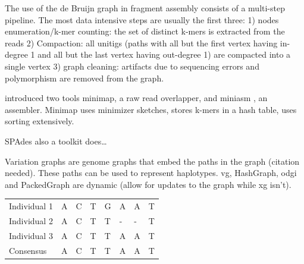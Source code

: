 \documentclass[11pt]{article}
\begin{document}

The use of the de Bruijn graph in fragment assembly consists of a multi-step 
pipeline.
The most data intensive steps are usually the first three: 1) nodes
enumeration/k-mer counting: the set of distinct k-mers is extracted from the 
reads 2) Compaction: all unitigs (paths with all but the first vertex having 
in-degree 1 and all but the last vertex having out-degree 1) are compacted into
a single vertex 3) graph cleaning: artifacts due to sequencing errors and
polymorphism are removed from the graph.

\cite{liMinimapMiniasmFast2016} introduced two tools minimap, a raw read 
overlapper, and miniasm \cite{liMinimapMiniasmFast2016}, an assembler. 
Minimap uses minimizer sketches, stores k-mers in a hash table, uses sorting 
extensively.

SPAdes also a toolkit does…

\newpage
Variation graphs are genome graphs that embed the paths in the graph 
(citation needed).
These paths can be used to represent haplotypes. vg, HashGraph, odgi and
PackedGraph are dynamic (allow for updates to the graph while xg isn’t).


\begin{center}
\begin{tabular}{llllllll}
\color{mypink}Individual 1 & \color{mypink} A & \color{mypink} C & \color{mypink} T & \color{mypink} G & \color{mypink} A & \color{mypink} A & \color{mypink} T\\
\color{myblue}Individual 2 & \color{myblue} A & \color{myblue} C & \color{myblue} T & \color{myblue} T & \color{myblue} - & \color{myblue} - & \color{myblue} T\\
\color{mygreen}Individual 3 & \color{mygreen} A & \color{mygreen} C & \color{mygreen} T & \color{mygreen} T & \color{mygreen} A & \color{mygreen} A & \color{mygreen} T\\
\hline
\color{red}Consensus & \color{red} A & \color{red} C & \color{red} T & \color{red} T & \color{red} A & \color{myred} A & \color{red} T\\
\end{tabular}
\end{center}
\end{document}
